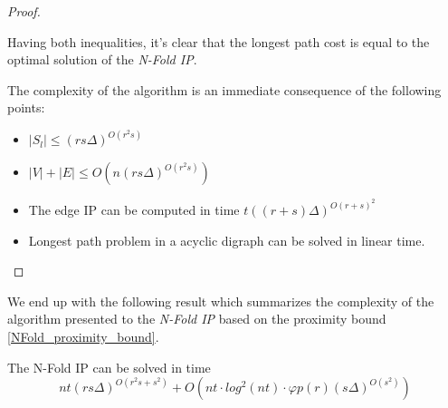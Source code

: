 \begin{proof}
\begin{center}
\end{center}

Having both inequalities, it's clear that the longest path cost is equal to the optimal solution of the \emph{N-Fold IP}. 

The complexity of the algorithm is an immediate consequence of the following points:
\vspace{-30pt}
\begin{itemize}
    \item $|S_l| \leq (rs\Delta)^{O(r^2s)}$
    \item $|V| + |E| \leq O(n(rs\Delta)^{O(r^2s)})$
    \item The edge IP can be computed in time $t((r + s)\Delta)^{O(r + s)^2}$
    \item Longest path problem in a acyclic digraph can be solved in linear time.
\end{itemize}
\end{proof}

We end up with the following result which summarizes the complexity of the algorithm presented to the \emph{N-Fold IP} based on the proximity bound \ref{NFold_proximity_bound}.
\begin{theorem}
    The N-Fold IP can be solved in time 
    \begin{equation*}
        nt(rs\Delta)^{O(r^2s + s^2)} + O(nt \cdot log^2(nt) \cdot \varphi p(r) (s\Delta)^{O(s^2)})
    \end{equation*}
\end{theorem}
